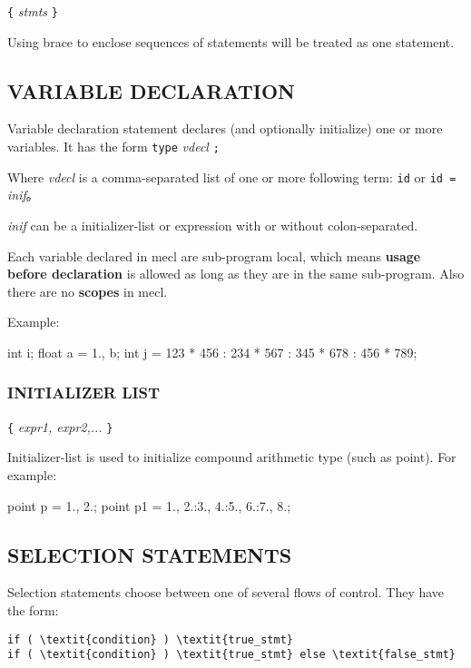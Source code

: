 \documentclass{article}
\begin{document}
\verb|{| \textit{stmts} \verb|}|

Using brace to enclose sequences of statements will be treated as one statement.

\subsection{VARIABLE DECLARATION}

Variable declaration statement declares (and optionally initialize) one or more variables. It has the form \verb|type| \textit{vdecl} \verb|;|

Where \textit{vdecl} is a comma-separated list of one or more following term: \verb|id| or \verb|id =| \textit{inif}。

\textit{inif} can be a initializer-list or expression with or without colon-separated.

Each variable declared in mecl are sub-program local, which means \textbf{usage before declaration} is allowed as long as they are in the same sub-program. Also there are no \textbf{scopes} in mecl.

Example:

\begin{MUAvbt}
int i;
float a = 1., b;
int j = 123 * 456 : 234 * 567 : 345 * 678 : 456 * 789;
\end{MUAvbt}

\subsubsection{INITIALIZER LIST}

\verb|{| \textit{expr1, expr2,...} \verb|}|

Initializer-list is used to initialize compound arithmetic type (such as point). For example:

\begin{MUAvbt}
point p = {1., 2.};
point p1 = {1., 2.}:{3., 4.}:{5., 6.}:{7., 8.};
\end{MUAvbt}

\subsection{SELECTION STATEMENTS}

Selection statements choose between one of several flows of control. They have the form:

\begin{Verbatim}[frame=single, rulecolor=\color{magenta}, commandchars=\\\{\}]
if ( \textit{condition} ) \textit{true_stmt}
if ( \textit{condition} ) \textit{true_stmt} else \textit{false_stmt}
\end{Verbatim}
\end{document}
